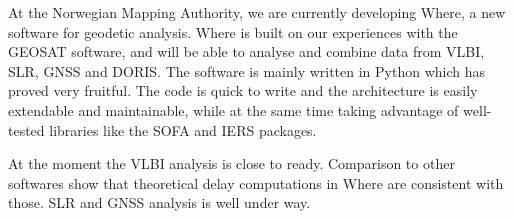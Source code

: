 At the Norwegian Mapping Authority, we are currently developing Where, a new
software for geodetic analysis. Where is built on our experiences with the
GEOSAT software, and will be able to analyse and combine data from VLBI, SLR,
GNSS and DORIS. The software is mainly written in Python which has proved very
fruitful. The code is quick to write and the architecture is easily extendable
and maintainable, while at the same time taking advantage of well-tested
libraries like the SOFA and IERS packages.

At the moment the VLBI analysis is close to ready. Comparison to other softwares
show that theoretical delay computations in Where are consistent with those. SLR
and GNSS analysis is well under way.

\endinput
